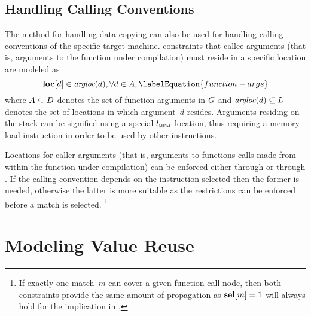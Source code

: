 \subsection{Handling Calling Conventions}

The method for handling \gls{data copying} can also be used for handling calling
conventions of the specific \gls{target machine}.
%
\Glspl{constraint} that callee arguments (that is, arguments to the
\gls{function} under compilation) must reside in a specific location are modeled
as
%
\begin{equation}
  \mVar{loc}[d] \in \mArgLoc(d),
  \forall d \in \mArgSet,
  \labelEquation{function-args}
\end{equation}
%
where \mbox{$\mArgSet \subseteq \mDataSet$} denotes the set of \gls{function}
arguments in $G$ and \mbox{$\operatorname{\textit{argloc}}(d) \subseteq L$}
denotes the set of locations in which argument~$d$ resides.
%
Arguments residing on the stack can be signified using a special $l_\textsc{mem}$
location, thus requiring a memory load \gls{instruction} in order to be used by
other \glspl{instruction}.

Locations for caller arguments (that is, arguments to \glspl{function} calls
made from within the \gls{function} under compilation) can be enforced either
through  or through
.
%
If the calling convention depends on the \gls{instruction} selected then the
former is needed, otherwise the latter is more suitable as the restrictions can
be enforced before a \gls{match} is selected.\!%
%
\footnote{%
  If exactly one \gls{match}~$m$ can cover a given \gls{function} call
  \gls{node}, then both \glspl{constraint} provide the same amount of
  propagation as \mbox{$\mVar{sel}[m] = 1$} will always hold for the implication
  in .
}


\section{Modeling Value Reuse}

